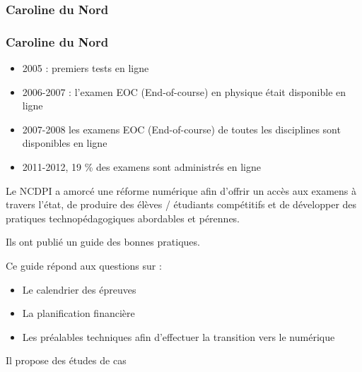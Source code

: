\documentclass[aspectratio=169]{beamer}
\begin{document}
			\subsubsection{Caroline du Nord} 
				\begin{frame}[allowframebreaks]
					  \frametitle{Caroline du Nord\citep{NorthCarolina2013}}
				 	\begin {itemize}
						\item 2005 : premiers tests en ligne
						\item 2006-2007 :  l'examen EOC  (End-of-course) en physique était disponible en ligne
						\item 2007-2008 les examens EOC  (End-of-course) de toutes les disciplines sont disponibles en ligne
						\item 2011-2012, 19 \% des examens sont administrés en ligne
					\end{itemize}
					\par Le NCDPI a amorcé une réforme numérique afin d'offrir un accès aux examens à travers l'état, de produire des élèves / étudiants compétitifs et de développer des pratiques technopédagogiques abordables et pérennes. 
					\par Ils ont publié un guide des bonnes pratiques.
					\par Ce guide répond aux questions sur :
					\begin {itemize}
						\item Le calendrier des épreuves
						\item La planification financière
						\item Les préalables techniques afin d'effectuer la transition vers le numérique
						
						
					\end{itemize}
					\par Il propose des études de cas
				\end{frame}
		
		
\end{document}
